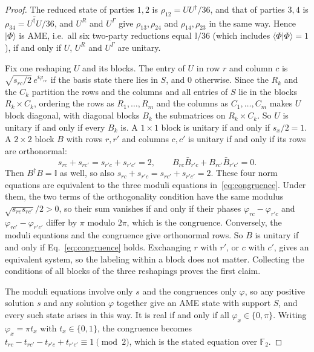 \documentclass[aps,pra,reprint,superscriptaddress,amsmath,amssymb,longbibliography]{revtex4-2}
\newcommand{\ket}[1]{\lvert #1\rangle}
\newcommand{\braket}[2]{\langle #1\vert #2\rangle}
\theoremstyle{plain}
\begin{document}
\begin{proof}
The reduced state of parties $1,2$ is $\rho_{12}=UU^\dagger/36$, and that of parties $3,4$ is
$\rho_{34}=\overline{U^\dagger U}/36$, and $U^R$ and $U^\Gamma$ give $\rho_{13},\rho_{24}$ and $\rho_{14},\rho_{23}$ in
the same way.  Hence $\ket\Phi$ is AME, i.e.\ all six
two-party reductions equal $\mathbb I/36$ (which includes $\braket{\Phi}{\Phi}=1$), if and only if $U$, $U^R$ and
$U^\Gamma$ are unitary.

Fix one reshaping $U$ and its blocks.  The entry of $U$ in row $r$ and column $c$ is $\sqrt{s_{rc}/2}\,e^{i\varphi_{rc}}$
if the basis state there lies in $S$, and $0$ otherwise.  Since the $R_k$ and the $C_k$ partition the rows and the
columns and all entries of $S$ lie in the blocks $R_k\times C_k$, ordering the rows as $R_1,\dots,R_m$ and the columns
as $C_1,\dots,C_m$ makes $U$ block diagonal, with diagonal blocks $B_k$ the submatrices on $R_k\times C_k$.  So $U$ is unitary if and only if every $B_k$ is.  A $1\times1$ block is unitary if and
only if $s_x/2=1$.  A $2\times2$ block $B$ with rows $r,r'$ and columns $c,c'$ is unitary if and only if its rows are
orthonormal:
\[
s_{rc}+s_{rc'}=s_{r'c}+s_{r'c'}=2,\qquad B_{rc}\bar B_{r'c}+B_{rc'}\bar B_{r'c'}=0.
\]
Then $B^\dagger B=\mathbb I$ as well, so also $s_{rc}+s_{r'c}=s_{rc'}+s_{r'c'}=2$.  These four norm equations are
equivalent to the three moduli equations in~\eqref{eq:congruence}.  Under them, the two terms of the orthogonality
condition have the same modulus $\sqrt{s_{rc}s_{rc'}}/2>0$, so their sum vanishes if and only if their phases
$\varphi_{rc}-\varphi_{r'c}$ and $\varphi_{rc'}-\varphi_{r'c'}$ differ by $\pi$ modulo $2\pi$, which is the congruence.
Conversely, the moduli equations and the congruence give orthonormal rows.  So $B$ is unitary if and only if
Eq.~\eqref{eq:congruence} holds.  Exchanging $r$ with $r'$, or $c$ with $c'$, gives an equivalent system, so the
labeling within a block does not matter.  Collecting the conditions of all blocks of the three reshapings proves the
first claim.

The moduli equations involve only $s$ and the congruences only $\varphi$, so any positive solution $s$ and any
solution $\varphi$ together give an AME state with support $S$, and every such state arises in this way.  It is real
if and only if all $\varphi_x\in\{0,\pi\}$.  Writing $\varphi_x=\pi t_x$ with $t_x\in\{0,1\}$, the congruence becomes
$t_{rc}-t_{rc'}-t_{r'c}+t_{r'c'}\equiv1\pmod2$, which is the stated equation over $\mathbb F_2$.
\end{proof}
\end{document}
